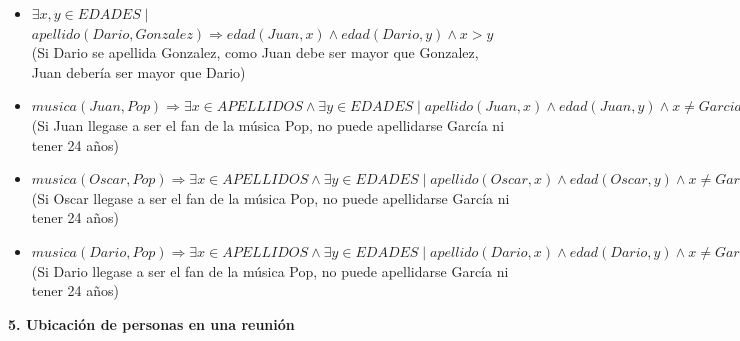 \documentclass[12pt]{article}
\begin{document}
\begin{itemize}
\begin{itemize}
\item $\exists x,y \in EDADES \mid$ \\ $ apellido(Dario, Gonzalez) \Rightarrow edad(Juan,x) \land edad(Dario,y) \land x > y$ \\ (Si Dario se apellida Gonzalez, como Juan debe ser mayor que Gonzalez, Juan debería ser mayor que Dario)
\item $musica(Juan, Pop) \Rightarrow \exists x \in APELLIDOS \land \exists y \in EDADES \mid apellido(Juan, x) \land edad(Juan, y) \land x \neq Garcia \land y \neq 24$ \\
(Si Juan llegase a ser el fan de la música Pop, no puede apellidarse García ni tener 24 años)
\item $musica(Oscar, Pop) \Rightarrow \exists x \in APELLIDOS \land \exists y \in EDADES \mid apellido(Oscar, x) \land edad(Oscar, y) \land x \neq Garcia \land y \neq 24$ \\
(Si Oscar llegase a ser el fan de la música Pop, no puede apellidarse García ni tener 24 años)
\item $musica(Dario, Pop) \Rightarrow \exists x \in APELLIDOS \land \exists y \in EDADES \mid apellido(Dario, x) \land edad(Dario, y) \land x \neq Garcia \land y \neq 24$ \\
(Si Dario llegase a ser el fan de la música Pop, no puede apellidarse García ni tener 24 años)
\end{itemize}
\end{itemize}

\newpage

\begin{flushleft}
\textbf{5. Ubicación de personas en una reunión}
\end{flushleft}
\end{document}
